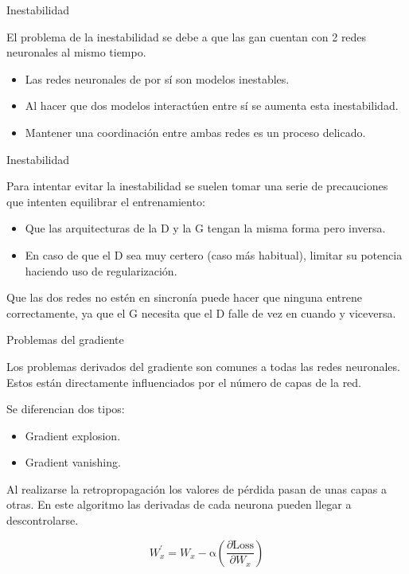 \begin{frame}{Inestabilidad}

    {\Large El problema de la \alert{inestabilidad} se debe a que las \gls{gan} cuentan con \alert{2} redes neuronales al mismo tiempo.}
    
    \begin{itemize}
        \item Las redes neuronales de por sí son modelos \alert{inestables}.
        \item Al hacer que dos modelos \alert{interactúen} entre sí se \alert{aumenta esta inestabilidad}.
        \item Mantener una \alert{coordinación} entre ambas redes es un \alert{proceso delicado}.
    \end{itemize}
    
\end{frame}

\begin{frame}{Inestabilidad}
    
    Para intentar evitar la \alert{inestabilidad} se suelen tomar una serie de \alert{precauciones} que intenten \alert{equilibrar el entrenamiento}:
    
    \begin{itemize}
        \item Que las \alert{arquitecturas} de la D y la G tengan la \alert{misma forma} pero inversa.
        \item En caso de que el D sea muy \alert{certero} (caso más habitual), limitar su potencia haciendo uso de \alert{regularización}.
    \end{itemize}
    
    Que las dos redes no estén en \alert{sincronía} puede hacer que ninguna entrene correctamente, ya que el G \alert{necesita} que el D falle de vez en cuando y viceversa.
    
\end{frame}

\begin{frame}{Problemas del gradiente}

    Los problemas \alert{derivados del gradiente} son comunes a todas las redes neuronales. Estos están \alert{directamente influenciados} por el número de capas de la red.
    
    Se diferencian dos tipos:
    \begin{itemize}
        \item Gradient explosion.
        \item Gradient vanishing.
    \end{itemize}
    
    Al realizarse la \alert{retropropagación} los \alert{valores de pérdida} pasan de unas capas a otras. En este algoritmo las derivadas de cada neurona pueden llegar a \alert{descontrolarse}.
    
    \begin{equation}
        W_{x}^{\prime}=W_{x}-\mathrm{\alpha}\left(\frac{\partial \text {Loss}}{\partial W_{x}}\right)
    \end{equation}
    
\end{frame}

